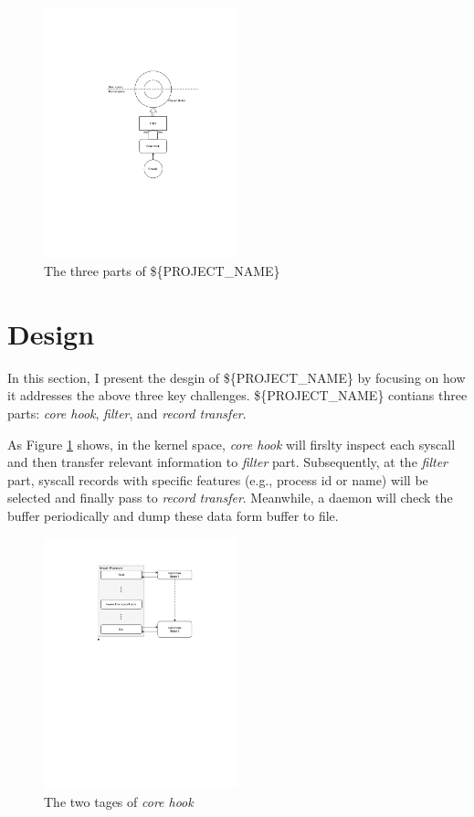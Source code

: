 \begin{figure}
    \centering
    \includegraphics[width=0.5\textwidth]{figures/arch.pdf}
    \caption{The three parts of \$\{PROJECT\_NAME\}}
    \label{fig:arch}
\end{figure}


\section{Design}


In this section, I present the desgin of \$\{PROJECT\_NAME\} by focusing on how it addresses the above three key challenges. \$\{PROJECT\_NAME\} contians three parts: \textit{core hook}, \textit{filter}, and \textit{record transfer}. 

As Figure \ref{fig:arch} shows, in the kernel space, \textit{core hook} will firslty inspect each syscall and then transfer relevant information to \textit{filter} part. Subsequently, at the \textit{filter} part, syscall records with specific features (e.g., process id or name) will be selected and finally pass to \textit{record transfer}. Meanwhile, a daemon will check the buffer periodically and dump these data form buffer to file.

\begin{figure}
    \centering
    \includegraphics[width=0.5\textwidth]{figures/core-hook-desgin.pdf}
    \caption{The two tages of \textit{core hook}}
    \label{fig:core-hook-desgin}
\end{figure}


